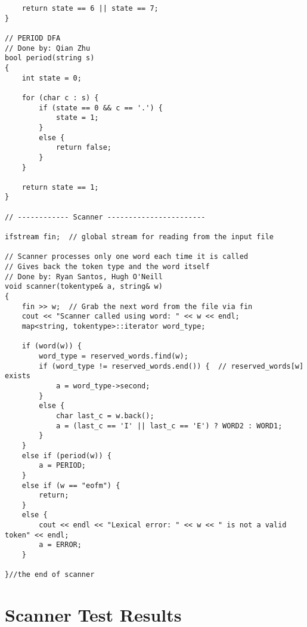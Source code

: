 \documentclass{article}
\begin{document}
\begin{Verbatim}
	return state == 6 || state == 7;
}

// PERIOD DFA
// Done by: Qian Zhu
bool period(string s)
{
	int state = 0;

	for (char c : s) {
		if (state == 0 && c == '.') {
			state = 1;
		}
		else {
			return false;
		}
	}

	return state == 1;
}

// ------------ Scanner -----------------------

ifstream fin;  // global stream for reading from the input file

// Scanner processes only one word each time it is called
// Gives back the token type and the word itself
// Done by: Ryan Santos, Hugh O'Neill
void scanner(tokentype& a, string& w)
{
	fin >> w;  // Grab the next word from the file via fin
	cout << "Scanner called using word: " << w << endl;
	map<string, tokentype>::iterator word_type;

	if (word(w)) {
		word_type = reserved_words.find(w);
		if (word_type != reserved_words.end()) {  // reserved_words[w] exists
			a = word_type->second;
		}
		else {
			char last_c = w.back();
			a = (last_c == 'I' || last_c == 'E') ? WORD2 : WORD1;
		}
	}
	else if (period(w)) {
		a = PERIOD;
	}
	else if (w == "eofm") {
		return;
	}
	else {
		cout << endl << "Lexical error: " << w << " is not a valid token" << endl;
		a = ERROR;
	}

}//the end of scanner
	\end{Verbatim}
	
	\section{Scanner Test Results}
\end{document}
